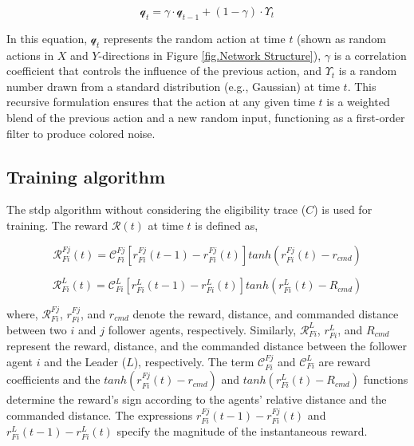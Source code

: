 \begin{equation} \label{Eq.NS.8}
\mathcal{q}_t = \gamma \cdot \mathcal{q}_{t-1} + (1-\gamma) \cdot \Upsilon_t
\end{equation}

In this equation, \(\mathcal{q}_{t}\) represents the random action at time \(t\) (shown as random actions in $X$ and $Y$-directions in Figure \ref{fig.Network Structure}), \(\gamma\) is a correlation coefficient that controls the influence of the previous action, and \(\Upsilon_{t}\) is a random number drawn from a standard distribution (e.g., Gaussian) at time \(t\). This recursive formulation ensures that the action at any given time \(t\) is a weighted blend of the previous action and a new random input, functioning as a first-order filter to produce colored noise.



\subsection{Training algorithm}

The \ac{stdp} algorithm without considering the eligibility trace (\(C\)) is used for training. The reward \(\mathcal{R}(t)\) at time \(t\) is defined as,

\begin{equation} \label{Eq.TA.3}
    \mathcal{R}_{Fi}^{Fj}(t) = \mathcal{C}_{Fi}^{Fj}\left[r_{Fi}^{Fj}(t-1)-r_{Fi}^{Fj}(t)\right] tanh{(r_{Fi}^{Fj}(t)-r_{cmd})}
\end{equation}

\begin{equation} \label{Eq.TA.4}
    \mathcal{R}_{Fi}^{L}(t) = \mathcal{C}_{Fi}^{L}\left[r_{Fi}^{L}(t-1)-r_{Fi}^{L}(t)\right] tanh{(r_{Fi}^{L}(t)-R_{cmd})}
\end{equation}

\noindent where, \(\mathcal{R}_{Fi}^{Fj}\), \(r_{Fi}^{Fj}\), and \(r_{cmd}\) denote the reward, distance, and commanded distance between two \(i\) and \(j\) follower agents, respectively. Similarly, \(\mathcal{R}_{Fi}^{L}\), \(r_{Fi}^{L}\), and \(R_{cmd}\) represent the reward, distance, and the commanded distance between the follower agent \(i\) and the Leader (\(L\)), respectively. The term \(\mathcal{C}_{Fi}^{Fj}\) and \(\mathcal{C}_{Fi}^{L}\) are reward coefficients and the \(tanh{(r_{Fi}^{Fj}(t)-r_{cmd})}\) and \(tanh{(r_{Fi}^{L}(t)-R_{cmd})}\) functions determine the reward's sign according to the agents' relative distance and the commanded distance. The expressions \(r_{Fi}^{Fj}(t-1)-r_{Fi}^{Fj}(t)\) and \(r_{Fi}^{L}(t-1)-r_{Fi}^{L}(t)\) specify the magnitude of the instantaneous reward.


